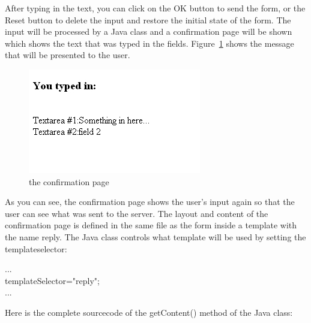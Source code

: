 After typing in the text, you can click on the OK button to send the form, or the Reset button
to delete the input and restore the initial state of the form.
The input will be processed by a Java class and a confirmation page will be shown
which shows the text that was typed in the fields.
Figure~\ref{TypeIn} shows the message that will be presented to the user.

\begin{figure}
\begin{center}
\includegraphics[clip,width=0.5\linewidth]{pics/modules/39}
\end{center}
\caption[the confirmation page]{the confirmation page}
\label{TypeIn}
\end{figure}

As you can see, the confirmation page shows the user's input again
so that the user can see what was sent to the server. The
layout and content of the confirmation page is defined in the same file
as the form inside a template with the name {\name reply}. The Java class
controls what template will be used by setting the templateselector:

{\code ...\\templateSelector="reply";\\...}

Here is the complete sourcecode of the {\meth getContent()}
method of the Java class:

